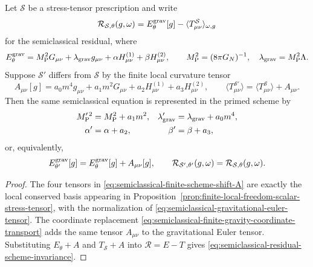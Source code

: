 \begin{proposition}
\label{prop:semiclassical-finite-scheme-transport}
Let \(\mathcal S\) be a stress-tensor prescription and write
\[
  \mathcal R_{\mathcal S,\theta}(g,\omega)
  =
  E^{\rm grav}_\theta[g]
  -
  \langle T_{\mu\nu}^{\mathcal S}\rangle_{\omega,g}
\]
for the semiclassical residual, where
\[
  E^{\rm grav}_\theta
  =
  M_{\rm P}^2G_{\mu\nu}
  +
  \lambda_{\rm grav}g_{\mu\nu}
  +
  \alpha H^{(1)}_{\mu\nu}
  +
  \beta H^{(2)}_{\mu\nu},
  \qquad
  M_{\rm P}^2=(8\pi G_N)^{-1},
  \quad
  \lambda_{\rm grav}=M_{\rm P}^2\Lambda .
\]
Suppose \(\mathcal S'\) differs from \(\mathcal S\) by the finite local
curvature tensor
\begin{equation}
  A_{\mu\nu}[g]
  =
  a_0m^4g_{\mu\nu}
  +
  a_1m^2G_{\mu\nu}
  +
  a_2H^{(1)}_{\mu\nu}
  +
  a_3H^{(2)}_{\mu\nu},
  \qquad
  \langle T_{\mu\nu}^{\mathcal S'}\rangle
  =
  \langle T_{\mu\nu}^{\mathcal S}\rangle
  +
  A_{\mu\nu}.
  \label{eq:semiclassical-finite-scheme-shift-A}
\end{equation}
Then the same semiclassical equation is represented in the primed scheme by
\begin{equation}
\begin{aligned}
  M_{\rm P}^{\prime\,2}
  &=
  M_{\rm P}^{2}+a_1m^2,
  &
  \lambda_{\rm grav}'
  &=
  \lambda_{\rm grav}+a_0m^4,
  \\
  \alpha'&=\alpha+a_2,
  &
  \beta'&=\beta+a_3 ,
\end{aligned}
  \label{eq:semiclassical-finite-gravity-coordinate-transport}
\end{equation}
or, equivalently,
\begin{equation}
  E^{\rm grav}_{\theta'}[g]
  =
  E^{\rm grav}_{\theta}[g]+A_{\mu\nu}[g],
  \qquad
  \mathcal R_{\mathcal S',\theta'}(g,\omega)
  =
  \mathcal R_{\mathcal S,\theta}(g,\omega).
  \label{eq:semiclassical-residual-scheme-invariance}
\end{equation}
\end{proposition}

\begin{proof}
The four tensors in
\eqref{eq:semiclassical-finite-scheme-shift-A} are exactly the local conserved
basis appearing in
Proposition~\ref{prop:finite-local-freedom-scalar-stress-tensor}, with the
normalization of
\eqref{eq:semiclassical-gravitational-euler-tensor}.  The coordinate
replacement
\eqref{eq:semiclassical-finite-gravity-coordinate-transport} adds the same
tensor \(A_{\mu\nu}\) to the gravitational Euler tensor.  Substituting
\(E_\theta+A\) and \(T_{\mathcal S}+A\) into
\(\mathcal R=E-T\) gives
\eqref{eq:semiclassical-residual-scheme-invariance}.
\end{proof}

